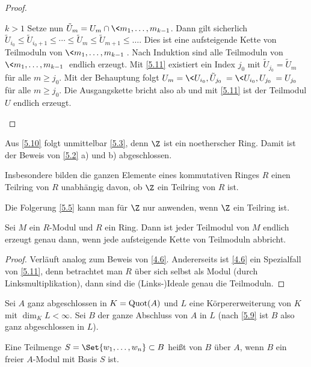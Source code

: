 \begin{st}
\begin{proof}
\begin{seg}{$k > 1$}
			Setze nun $\tilde U_m = U_m \cap \<m_1, \dotsc, m_{k-1}$.
			Dann gilt sicherlich $\tilde U_{i_0} \le \tilde U_{i_0 + 1} \le \dotsb \le \tilde U_m \le \tilde U_{m+1} \le \dotsc $.
			Dies ist eine aufsteigende Kette von Teilmoduln von $\<m_1, \dotsc, m_{k-1}\>$.
			Nach Induktion sind alle Teilmoduln von $\<m_1, \dotsc, m_{k-1}\>$ endlich erzeugt.
			Mit \ref{5.11} existiert ein Index $j_0$ mit $\tilde U_{j_0} = \tilde U_m$ für alle $m \ge j_0$.
			Mit der Behauptung folgt $U_m = \<U_{i_0}, \tilde U_{j_0}\> = \<U_{i_0}, U_{j_0}\> = U_{j_0}$ für alle $m \ge j_0$.
			Die Ausgangskette bricht also ab und mit \ref{5.11} ist der Teilmodul $U$ endlich erzeugt.
		\end{seg}
	\end{proof}
	\begin{note}
		Aus \ref{5.10} folgt unmittelbar \ref{5.3}, denn $\Z$ ist ein noetherscher Ring.
		Damit ist der Beweis von \ref{5.2} a) und b) abgeschlossen.

		Insbesondere bilden die ganzen Elemente eines kommutativen Ringes $R$ einen Teilring von $R$ unabhängig davon, ob $\Z$ ein Teilring von $R$ ist.

		Die Folgerung \ref{5.5} kann man für $\Z$ nur anwenden, wenn $\Z$ ein Teilring ist.
	\end{note}
\end{st}

\begin{lem} \label{5.11}
	Sei $M$ ein $R$-Modul und $R$ ein Ring.
	Dann ist jeder Teilmodul von $M$ endlich erzeugt genau dann, wenn jede aufsteigende Kette von Teilmoduln abbricht.
	\begin{proof}
		Verläuft analog zum Beweis von \ref{4.6}.
		Andererseits ist \ref{4.6} ein Spezialfall von \ref{5.11}, denn betrachtet man $R$ über sich selbst als Modul (durch Linksmultiplikation), dann sind die (Links-)Ideale genau die Teilmoduln.
	\end{proof}
\end{lem}

\begin{st} \label{5.12}
	Sei $A$ ganz abgeschlossen in $K = \operatorname{Quot}(A)$ und $L$ eine Körpererweiterung von $K$ mit $\dim_K L < \infty$.
	Sei $B$ der ganze Abschluss von $A$ in $L$ (nach \ref{5.9} ist $B$ also ganz abgeschlossen in $L$).

	Eine Teilmenge $S = \Set{ w_1, \dotsc, w_n } \subset B$ heißt  von $B$ über $A$, wenn $B$ ein freier $A$-Modul mit Basis $S$ ist.
\end{st}

